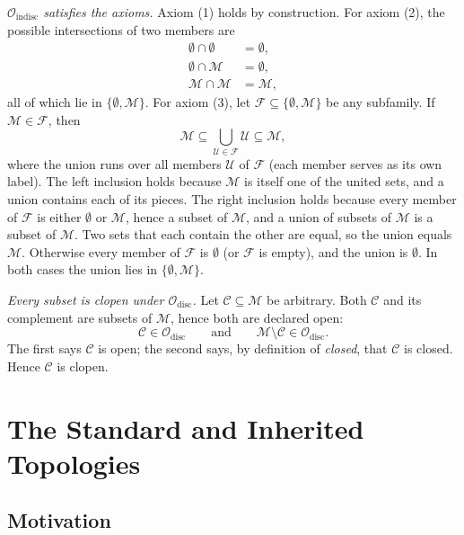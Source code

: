\documentclass[11pt]{article}
\begin{document}
\emph{$\mathcal O_{\mathrm{indisc}}$ satisfies the axioms.} Axiom (1) holds by construction. For axiom (2), the possible intersections of two members are
\begin{align*}
\emptyset\cap\emptyset&=\emptyset,\\
\emptyset\cap\mathcal M&=\emptyset,\\
\mathcal M\cap\mathcal M&=\mathcal M,
\end{align*}
all of which lie in $\{\emptyset,\mathcal M\}$. For axiom (3), let $\mathcal F\subseteq\{\emptyset,\mathcal M\}$ be any subfamily. If $\mathcal M\in\mathcal F$, then
\[
\mathcal M\subseteq\bigcup_{\mathcal U\in\mathcal F}\mathcal U\subseteq\mathcal M,
\]
where the union runs over all members $\mathcal U$ of $\mathcal F$ (each member serves as its own label). The left inclusion holds because $\mathcal M$ is itself one of the united sets, and a union contains each of its pieces. The right inclusion holds because every member of $\mathcal F$ is either $\emptyset$ or $\mathcal M$, hence a subset of $\mathcal M$, and a union of subsets of $\mathcal M$ is a subset of $\mathcal M$. Two sets that each contain the other are equal, so the union equals $\mathcal M$. Otherwise every member of $\mathcal F$ is $\emptyset$ (or $\mathcal F$ is empty), and the union is $\emptyset$. In both cases the union lies in $\{\emptyset,\mathcal M\}$.

\emph{Every subset is clopen under $\mathcal O_{\mathrm{disc}}$.} Let $\mathcal C\subseteq\mathcal M$ be arbitrary. Both $\mathcal C$ and its complement are subsets of $\mathcal M$, hence both are declared open:
\[
\mathcal C\in\mathcal O_{\mathrm{disc}}
\qquad\text{and}\qquad
\mathcal M\setminus\mathcal C\in\mathcal O_{\mathrm{disc}}.
\]
The first says $\mathcal C$ is open; the second says, by definition of \emph{closed}, that $\mathcal C$ is closed. Hence $\mathcal C$ is clopen.

\section{The Standard and Inherited Topologies}

\subsection*{Motivation}
\end{document}
